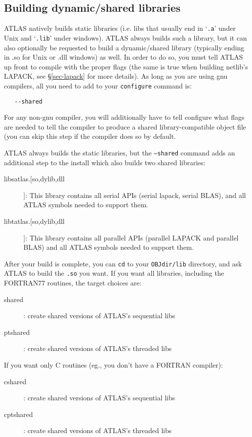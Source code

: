 \documentclass[11pt]{article}
\begin{document}
\clearpage
\subsection{Building dynamic/shared libraries}
\label{sec-shared}
ATLAS natively builds static libraries (i.e. libs that usually end in
`\texttt{.a}' under Unix and `\texttt{.lib}' under windows).  
ATLAS always builds such a library,
but it can also optionally be requested to build a dynamic/shared library
(typically ending in .so for Unix or .dll windows) as well.  In order to do so,
you must tell ATLAS up front to compile with the proper flags (the same is
true when building netlib's LAPACK, see \S\ref{sec-lapack} for more details).  
As long as you are using gnu compilers, all you need to add to your 
{\tt configure} command is:
\vspace*{-0.1in}
\begin{verbatim}
   --shared
\end{verbatim}

For any non-gnu compiler, you will additionally have to tell configure what
flags are
needed to tell the compiler to produce a shared library-compatible object
file (you can skip this step if the compiler does so by default.

ATLAS always builds the static libraries, but the {\tt --shared} command
adds an additional step to the install which also builds two shared libraries:
\begin{description}
\item [libsatlas.[so,dylib,dll]]: This library contains all serial APIs
      (serial lapack, serial BLAS), 
      and all ATLAS symbols needed to support them.
\item [libtatlas.[so,dylib,dll]]: This library contains all parallel
      APIs (parallel LAPACK and parallel BLAS) 
      and all ATLAS symbols needed to support them.
\end{description}

After your build is complete, you can {\tt cd} to your {\tt OBJdir/lib} 
directory, and
ask ATLAS to build the {\tt .so} you want.  If you want all libraries, including
the FORTRAN77 routines, the target choices are:
\begin{description}
\item [shared] : create shared versions of ATLAS's sequential libs
\item [ptshared] : create shared versions of ATLAS's threaded libs
\end{description}
If you want only C routines (eg., you don't have a FORTRAN compiler):
\begin{description}
\item [cshared] : create shared versions of ATLAS's sequential libs
\item [cptshared] : create shared versions of ATLAS's threaded libs
\end{description}
\end{document}
